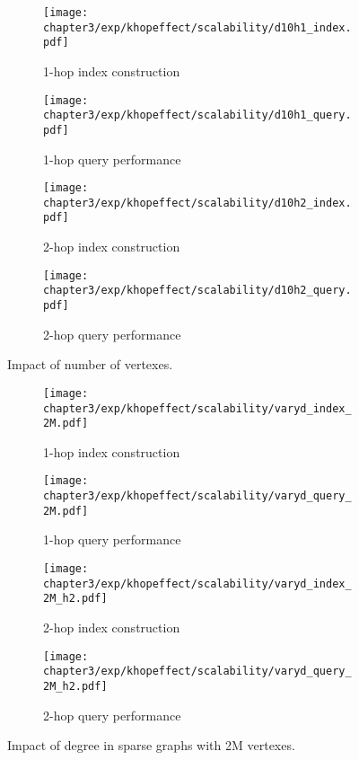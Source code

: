 \begin{figure}[t]
\centering
\begin{subfigure}{0.45\linewidth}
  \centering
  \texttt{[image: chapter3/exp/khopeffect/scalability/d10h1\_index.pdf]}
  \caption{1-hop index construction}
\end{subfigure}
\begin{subfigure}{0.45\linewidth}
  \centering
  \texttt{[image: chapter3/exp/khopeffect/scalability/d10h1\_query.pdf]}
  \caption{1-hop query performance}
\end{subfigure}
\begin{subfigure}{0.45\linewidth}
  \centering
  \texttt{[image: chapter3/exp/khopeffect/scalability/d10h2\_index.pdf]}
  \caption{2-hop index construction}
\end{subfigure}
\begin{subfigure}{0.45\linewidth}
  \centering
  \texttt{[image: chapter3/exp/khopeffect/scalability/d10h2\_query.pdf]}
  \caption{2-hop query performance}
\end{subfigure}
\caption{Impact of number of vertexes.}
\label{fig:khop_d10_h1}
\end{figure}

\begin{figure}[t]
\centering
\begin{subfigure}{0.45\linewidth}
  \centering
  \texttt{[image: chapter3/exp/khopeffect/scalability/varyd\_index\_2M.pdf]}
  \caption{1-hop index construction}
\end{subfigure}
\begin{subfigure}{0.45\linewidth}
  \centering
  \texttt{[image: chapter3/exp/khopeffect/scalability/varyd\_query\_2M.pdf]}
  \caption{1-hop query performance}
\end{subfigure}
\begin{subfigure}{0.45\linewidth}
  \centering
  \texttt{[image: chapter3/exp/khopeffect/scalability/varyd\_index\_2M\_h2.pdf]}
  \caption{2-hop index construction}
\end{subfigure}
\begin{subfigure}{0.45\linewidth}
  \centering
  \texttt{[image: chapter3/exp/khopeffect/scalability/varyd\_query\_2M\_h2.pdf]}
  \caption{2-hop query performance}
\end{subfigure}
\caption{Impact of degree in sparse graphs with 2M vertexes.}
\label{fig:khop_v2m}
\end{figure}

